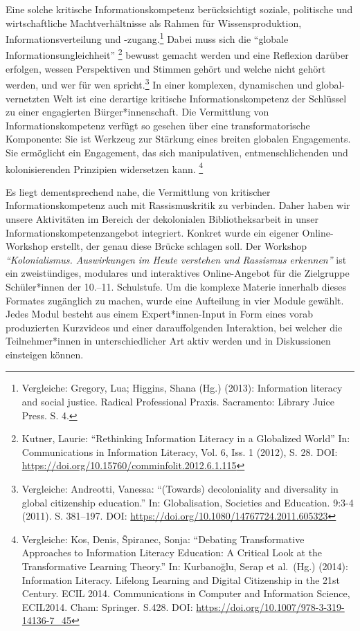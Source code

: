 \documentclass[a4paper,
fontsize=11pt,
oneside,
numbers=noperiodatend,
parskip=half-,
bibliography=totoc,
final
]{scrartcl}
\begin{document}
Eine solche kritische Informationskompetenz berücksichtigt soziale,
politische und wirtschaftliche Machtverhältnisse als Rahmen für
Wissensproduktion, Informationsverteilung und -zu\-gang.\footnote{Vergleiche:
  Gregory, Lua; Higgins, Shana (Hg.) (2013): Information literacy and
  social justice. Radical Professional Praxis. Sacramento: Library Juice
  Press. S. 4.} Dabei muss sich die \enquote{globale
Informationsungleichheit} \footnote{Kutner, Laurie: \enquote{Rethinking
  Information Literacy in a Globalized World} In: Communications in
  Information Literacy, Vol. 6, Iss. 1 (2012), S. 28. DOI:
  \url{https://doi.org/10.15760/comminfolit.2012.6.1.115}} bewusst
gemacht werden und eine Reflexion darüber erfolgen, wessen Perspektiven
und Stimmen gehört und welche nicht gehört werden, und wer für wen
spricht.\footnote{Vergleiche: Andreotti, Vanessa: \enquote{(Towards)
  decoloniality and diversality in global citizenship education.} In:
  Globalisation, Societies and Education. 9:3-4 (2011). S. 381--197.
  DOI: \url{https://doi.org/10.1080/14767724.2011.605323}} In einer
komplexen, dynamischen und global-vernetzten Welt ist eine derartige
kritische Informationskompetenz der Schlüssel zu einer engagierten
Bürger*innenschaft. Die Vermittlung von Informationskompetenz verfügt so
gesehen über eine transformatorische Komponente: Sie ist Werkzeug zur
Stärkung eines breiten globalen Engagements. Sie ermöglicht ein
Engagement, das sich manipulativen, entmenschlichenden und
kolonisierenden Prinzipien widersetzen kann. \footnote{Vergleiche: Kos,
  Denis, Špiranec, Sonja: \enquote{Debating Transformative Approaches to
  Information Literacy Education: A Critical Look at the Transformative
  Learning Theory.} In: Kurbanoğlu, Serap et al.~(Hg.) (2014):
  Information Literacy. Lifelong Learning and Digital Citizenship in the
  21st Century. ECIL 2014. Communications in Computer and Information
  Science, ECIL2014. Cham: Springer. S.428. DOI:
  \url{https://doi.org/10.1007/978-3-319-14136-7_45}}

Es liegt dementsprechend nahe, die Vermittlung von kritischer
Informationskompetenz auch mit Rassismuskritik zu verbinden. Daher haben
wir unsere Aktivitäten im Bereich der dekolonialen Bibliotheksarbeit in
unser Informationskompetenzangebot integriert. Konkret wurde ein eigener
Online-Workshop erstellt, der genau diese Brücke schlagen soll. Der
Workshop \emph{\enquote{Kolonialismus. Auswirkungen im Heute verstehen
und Rassismus erkennen}} ist ein zweistündiges, modulares und
interaktives Online-Angebot für die Zielgruppe Schüler*innen der
10.--11. Schulstufe. Um die komplexe Materie innerhalb dieses Formates
zugänglich zu machen, wurde eine Aufteilung in vier Module gewählt.
Jedes Modul besteht aus einem Expert*innen-Input in Form eines vorab
produzierten Kurzvideos und einer darauffolgenden Interaktion, bei
welcher die Teilnehmer*innen in unterschiedlicher Art aktiv werden und
in Diskussionen einsteigen können.
\end{document}
